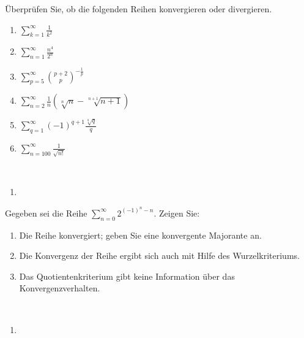 \bigskip


\begin{aufg}[6 Punkte]
\"Uberpr\"ufen Sie, ob die folgenden Reihen konvergieren oder divergieren.
\begin{enumerate}[label=$\mathrm{(\roman*)}$, ref=$\mathrm{\roman*}$]
\item $\sum\limits_{k=1}^\infty \frac{1}{k^2}$
\item $\sum\limits_{n=1}^\infty \frac{n^4}{2^n}$
\item $\sum\limits_{p=5}^\infty \binom{p+2}{p}^{-\frac1p}$
\item $\sum\limits_{n=2}^\infty \frac1n \left( \sqrt[n]{n} - \sqrt[n+1]{n+1} \right)$
\item $\sum\limits_{q=1}^\infty (-1)^{q+1} \frac{\sqrt[q]{q}}{q}$
\item $\sum\limits_{n=100}^\infty \frac{1}{\sqrt{n!}}$
\end{enumerate}
\end{aufg}

\bigskip

\begin{lsg}\mbox{ }
\begin{enumerate}[label=$\mathrm{(\roman*)}$, ref=$\mathrm{\roman*}$]
\item 
\end{enumerate}
\end{lsg}

\bigskip

\begin{aufg}[6 Punkte]
Gegeben sei die Reihe $\sum\limits_{n=0}^\infty 2^{(-1)^n-n}$. Zeigen Sie:
\begin{enumerate}[label=$\mathrm{(\roman*)}$, ref=$\mathrm{\roman*}$]
\item Die Reihe konvergiert; geben Sie eine konvergente Majorante an.
\item Die Konvergenz der Reihe ergibt sich auch mit Hilfe des Wurzelkriteriums.
\item Das Quotientenkriterium gibt keine Information \"uber das Konvergenzverhalten.
\end{enumerate}
\end{aufg}
 
\bigskip

\begin{lsg}\mbox{ }
\begin{enumerate}[label=$\mathrm{(\roman*)}$, ref=$\mathrm{\roman*}$]
\item 
\end{enumerate}
\end{lsg}


